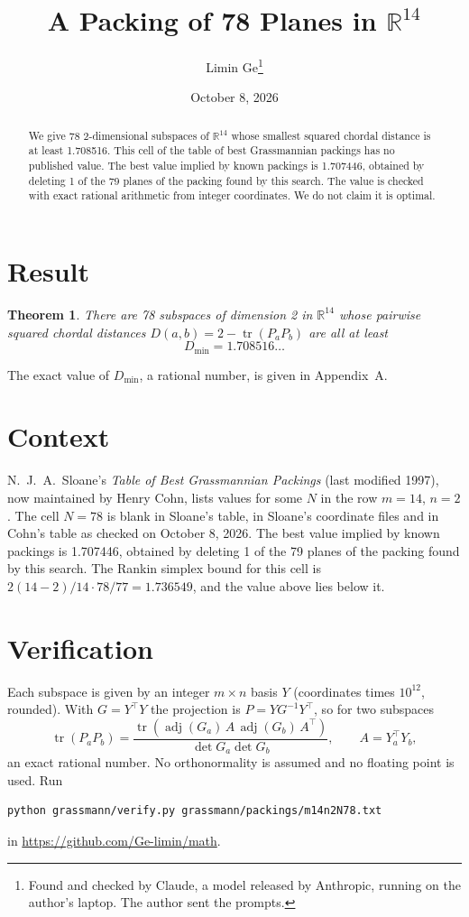 \documentclass[11pt,a4paper]{article}
\title{A Packing of 78 Planes in $\mathbb{R}^{14}$}
\author{Limin Ge\thanks{Found and checked by Claude, a model released by Anthropic, running on the author's laptop. The author sent the prompts.}}
\date{October 8, 2026}
\newtheorem*{theorem}{Theorem}
\begin{document}
\maketitle
\begin{abstract}
We give 78 2-dimensional subspaces of $\mathbb{R}^{14}$ whose smallest squared chordal distance is at least 1.708516. This cell of the table of best Grassmannian packings has no published value. The best value implied by known packings is 1.707446, obtained by deleting 1 of the 79 planes of the packing found by this search. The value is checked with exact rational arithmetic from integer coordinates. We do not claim it is optimal.
\end{abstract}

\section{Result}
\begin{theorem}
There are 78 subspaces of dimension 2 in $\mathbb{R}^{14}$ whose pairwise squared chordal distances $D(a,b) = 2 - \operatorname{tr}(P_aP_b)$ are all at least
\[ D_{\min} = 1.708516\ldots \]
\end{theorem}
The exact value of $D_{\min}$, a rational number, is given in Appendix~A.


\section{Context}
N.~J.~A.~Sloane's \emph{Table of Best Grassmannian Packings} (last modified 1997), now maintained by Henry Cohn, lists values for some $N$ in the row $m=14$, $n=2$. The cell $N=78$ is blank in Sloane's table, in Sloane's coordinate files and in Cohn's table as checked on October 8, 2026. The best value implied by known packings is 1.707446, obtained by deleting 1 of the 79 planes of the packing found by this search. The Rankin simplex bound for this cell is $2(14-2)/14\cdot 78/77 = 1.736549$, and the value above lies below it.


\section{Verification}
Each subspace is given by an integer $m\times n$ basis $Y$ (coordinates times $10^{12}$, rounded). With $G=Y^\top Y$ the projection is $P=YG^{-1}Y^\top$, so for two subspaces
\[ \operatorname{tr}(P_aP_b)=\frac{\operatorname{tr}(\operatorname{adj}(G_a)\,A\,\operatorname{adj}(G_b)\,A^\top)}{\det G_a\det G_b},\qquad A=Y_a^\top Y_b, \]
an exact rational number. No orthonormality is assumed and no floating point is used. Run
\begin{verbatim}
python grassmann/verify.py grassmann/packings/m14n2N78.txt
\end{verbatim}
in \url{https://github.com/Ge-limin/math}.
\end{document}
